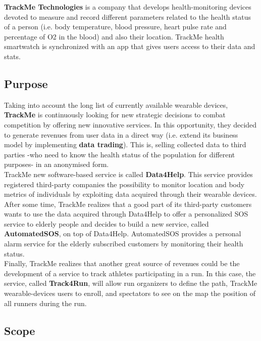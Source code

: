 \documentclass[12pt]{article}
\begin{document}
\textbf{TrackMe Technologies} is a company that develops health-monitoring devices devoted to measure and record different parameters related to the health status of a person (i.e. body temperature, blood pressure, heart pulse rate and percentage of O2 in the blood) and also their location. TrackMe health smartwatch is synchronized with an app that gives users access to their data and stats. 

\subsection{Purpose}
Taking into account the long list of currently available wearable devices, \textbf{TrackMe} is continuously looking for new strategic decisions to combat competition by offering new innovative services. In this opportunity, they decided to generate revenues from user data in a direct way (i.e. extend its business model by implementing \textbf{data trading}). This is, selling collected data to third parties -who need to know the health status of the population for different purposes- in an anonymised form.\\

TrackMe new software-based service is called \textbf{Data4Help}. This service provides registered third-party companies the possibility to monitor location and body metrics of individuals by exploiting data acquired through their wearable devices.\\

After some time, TrackMe realizes that a good part of its third-party customers wants to use the data acquired through Data4Help to offer a personalized SOS service to elderly people and decides to  build a new service, called \textbf{AutomatedSOS}, on top of Data4Help. AutomatedSOS provides a personal alarm service for the elderly subscribed customers by monitoring their health status.\\

Finally, TrackMe realizes that another great source of revenues could be the development of a service to track athletes participating in a run. In this case, the service, called \textbf{Track4Run}, will allow run organizers to define the path, TrackMe wearable-devices users to enroll, and spectators to see on the map the position of all runners during the run. \\

\subsection{Scope}
\end{document}
